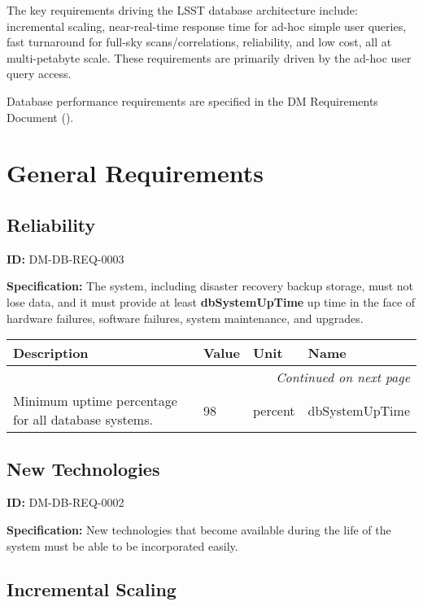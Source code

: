 \documentclass[SE,toc,lsstdraft]{lsstdoc}
\date{2017-06-29}
\makeatletter
\newcommand{\paramname}[1]{\hspace{0pt}#1}
\newcommand{\unitname}[1]{\hspace{0pt}#1}
\newenvironment{parameters}[0]{%
\setlength\LTleft{0pt}
\setlength\LTright{\fill}
\begin{small}
\begin{longtable}[]{|p{0.49\textwidth}|l|p{0.6in}|p{1.70in}@{}|}

\hline \textbf{Description} & \textbf{Value} & \textbf{Unit} & \textbf{Name} \\ \hline
\endhead

\hline \multicolumn{4}{r}{\emph{Continued on next page}} \\
\endfoot

\hline\hline
\endlastfoot
}{%
\hline
\end{longtable}
\end{small}
}
\makeatother
\begin{document}
\maketitle

The key requirements driving the LSST database architecture include: incremental scaling, near-real-time response time for ad-hoc simple user queries, fast turnaround for full-sky scans/correlations, reliability, and low cost, all at multi-petabyte scale. These requirements are primarily driven by the ad-hoc user query access.

Database performance requirements are specified in the DM Requirements Document ().

\section{General Requirements}

\subsection{Reliability}

\label{DM-DB-REQ-0003}
\textbf{ID:} DM-DB-REQ-0003

\textbf{Specification:}
The system, including disaster recovery backup storage, must not lose data, and it must provide at least \textbf{dbSystemUpTime} up time in the face of hardware failures, software failures, system maintenance, and upgrades.

\begin{parameters}
Minimum uptime percentage for all database systems.
&
98
&
\unitname{%
percent
}
&
\paramname{%
dbSystemUpTime
} \\\hline
\end{parameters}

\subsection{New Technologies}

\label{DM-DB-REQ-0002}
\textbf{ID:} DM-DB-REQ-0002

\textbf{Specification:}
New technologies that become available during the life of the system must be able to be incorporated easily.

\subsection{Incremental Scaling}
\end{document}
